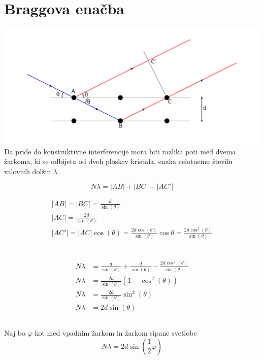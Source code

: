 \documentclass[a4paper,12pt]{article}
\begin{document}
\section{Braggova enačba}
\includegraphics[width=\textwidth]{bragg.png}
Da pride do konstruktivne interferencije mora biti razlika poti med dvema žarkoma, ki se odbijeta od dveh ploskev kristala, enaka celotnemu številu valovnih dolžin $\lambda$

\begin{equation}
    N\lambda = |AB| + |BC| - |AC'|
\end{equation}

\begin{align}
    |AB| = |BC| = \frac{d}{\sin(\theta)} \\
    |AC| = \frac{2d}{\tan(\theta)} \\
    |AC'| = |AC| \cos(\theta) = \frac{2d \cos(\theta)}{\sin(\theta)} \cos{\theta} = \frac{2d \cos^2(\theta)}{\sin(\theta)} \\
\end{align}

\subsection{}
\begin{align}
    N\lambda & = \frac{d}{\sin(\theta)} + \frac{d}{\sin(\theta)} - \frac{2d \cos^2(\theta)}{\sin(\theta)} \\
    N\lambda & = \frac{2d}{\sin(\theta)}(1 - \cos^2(\theta)) \\
    N\lambda & = \frac{2d}{\sin(\theta)} \sin^2(\theta) \\
    N\lambda & = 2d \sin(\theta)
\end{align}
\subsection{}
Naj bo $\varphi$ kot med vpadnim žarkom in žarkom sipane svetlobe
\begin{equation}
    N \lambda = 2d \sin(\frac{1}{2} \varphi)
\end{equation}
\end{document}

